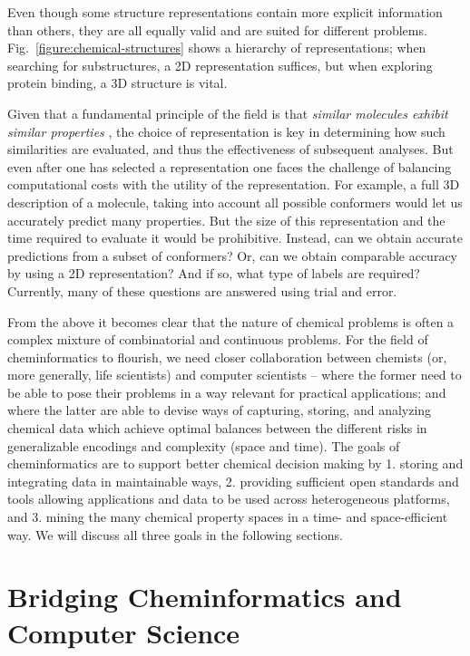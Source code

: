 \documentclass{sig-alternate}
\begin{document}
Even though some structure representations contain more explicit
information than others, they are all equally valid and are suited for
different problems. Fig.~\ref{figure:chemical-structures} shows 
a hierarchy of representations; when searching for
substructures, a 2D representation suffices, but when exploring 
protein binding, a 3D structure is vital.

Given that a fundamental principle of the field is that \emph{similar
molecules exhibit similar properties} \cite{Johnson:1990qf}, the
choice of representation is key in determining how such similarities
are evaluated, and thus the effectiveness of subsequent analyses. But
even after one has selected a representation one faces the challenge
of balancing computational costs with the utility of the
representation. For example, a full 3D description of a molecule,
taking into account all possible conformers would let us accurately
predict many properties. But the size of this representation and the
time required to evaluate it would be prohibitive. Instead, can we
obtain accurate predictions from a subset of conformers? Or, can we
obtain comparable accuracy by using a 2D representation? And if so,
what type of labels are required? Currently, many of these questions
are answered using trial and error.

From the above it becomes clear that the nature of chemical problems
is often a complex mixture of combinatorial and continuous problems.
For the field of cheminformatics to flourish, we need closer
collaboration between chemists (or, more generally, life scientists)
and computer scientists -- where the former need to be able to pose
their problems in a way relevant for practical applications; and where
the latter are able to devise ways of capturing, storing, and
analyzing chemical data which achieve optimal balances between the
different risks in generalizable encodings and complexity (space and
time). The goals of cheminformatics are to support better chemical
decision making by 1. storing and integrating data in maintainable
ways, 2.  providing sufficient open standards and tools allowing
applications and data to be used across heterogeneous platforms, and
3. mining the many chemical property spaces in a time- and
space-efficient way. We will discuss all three goals in the following
sections.

\section{Bridging Cheminformatics and Computer Science}
\end{document}

